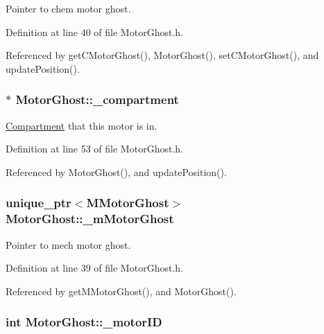Pointer to chem motor ghost. 



Definition at line 40 of file Motor\+Ghost.\+h.



Referenced by get\+C\+Motor\+Ghost(), Motor\+Ghost(), set\+C\+Motor\+Ghost(), and update\+Position().

\hypertarget{classMotorGhost_a3a16b996a9a4a7e51735b410e65d339c}{
\subsubsection[{\+\_\+compartment}]{$\ast$ Motor\+Ghost\+::\+\_\+compartment\hspace{0.3cm}{\ttfamily [private]}}}\label{classMotorGhost_a3a16b996a9a4a7e51735b410e65d339c}


\hyperlink{classCompartment}{Compartment} that this motor is in. 



Definition at line 53 of file Motor\+Ghost.\+h.



Referenced by Motor\+Ghost(), and update\+Position().

\hypertarget{classMotorGhost_a651509682f0faffe9b8e2d77e652312b}{
\subsubsection[{\+\_\+m\+Motor\+Ghost}]{\setlength{\rightskip}{0pt plus 5cm}unique\+\_\+ptr$<${\bf M\+Motor\+Ghost}$>$ Motor\+Ghost\+::\+\_\+m\+Motor\+Ghost\hspace{0.3cm}{\ttfamily [private]}}}\label{classMotorGhost_a651509682f0faffe9b8e2d77e652312b}


Pointer to mech motor ghost. 



Definition at line 39 of file Motor\+Ghost.\+h.



Referenced by get\+M\+Motor\+Ghost(), and Motor\+Ghost().

\hypertarget{classMotorGhost_a8af6f4cdc0bd8ab2300b6f4bba550f1c}{
\subsubsection[{\+\_\+motor\+I\+D}]{\setlength{\rightskip}{0pt plus 5cm}int Motor\+Ghost\+::\+\_\+motor\+I\+D\hspace{0.3cm}{\ttfamily [private]}}}\label{classMotorGhost_a8af6f4cdc0bd8ab2300b6f4bba550f1c}


